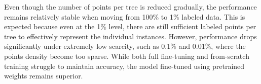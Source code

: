 \documentclass[review,authoryear]{elsarticle}
\begin{document}
\begin{table}[ht!]
    \centering
    \caption{Instance segmentation performance (mAP and AP50, \%) under uniform label reduction on the SCION dataset.}
    \label{tab:insseg_uniform_scion}
    \vspace{2mm}
\end{table}


Even though the number of points per tree is reduced gradually, the performance remains relatively stable when moving from 100\% to 1\% labeled data. This is expected because even at the 1\% level, there are still sufficient labeled points per tree to effectively represent the individual instances. However, performance drops significantly under extremely low scarcity, such as 0.1\% and 0.01\%, where the points density become too sparse. While both full fine-tuning and from-scratch training struggle to maintain accuracy, the model fine-tuned using pretrained weights remains superior. 
\end{document}
